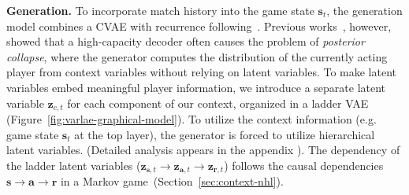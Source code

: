 \documentclass{article}
\newcommand{\context}{c}
\newcommand{\latentvariables}{\mathbf{z}}
\newcommand{\state}{\mathbf{s}}
\newcommand{\action}{\mathbf{a}}
\newcommand{\reward}{\boldsymbol{r}}
\begin{document}
{\bf Generation.}
To incorporate match history into the game state $\state_t$, the generation model combines a CVAE with recurrence following~\cite{ChungKDGCB15}. Previous works~\cite{HePosteriorCollapse19,ZhuBNVAE2020}, however, showed that a high-capacity decoder 
often causes the problem of {\it posterior collapse}, 
where the generator computes the distribution of the currently acting player from context variables without relying on latent variables. To make latent variables embed meaningful player information, we introduce a separate latent variable $\latentvariables_{\context,t}$ for each component of our context, organized in a ladder VAE~\cite{SonderbyLadderVAE16} (Figure~\ref{fig:varlae-graphical-model}). To utilize the context information (e.g. game state $\state_{t}$ at the top layer), the generator is forced to utilize hierarchical latent variables. (Detailed analysis appears in the appendix
). 
The dependency of the %
ladder latent variables  ($\latentvariables_{\state,t}\rightarrow \latentvariables_{\action,t}\rightarrow \latentvariables_{\reward,t}$) follows the causal dependencies $\state \rightarrow \action \rightarrow \reward$ in a Markov game~(Section~\ref{sec:context-nhl}). %
\end{document}
